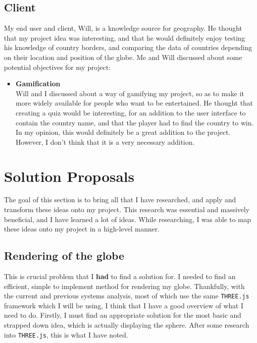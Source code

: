 \subsection{Client}
My end user and client, Will, is a knowledge source for geography. He thought that my project idea was interesting, and that he would definitely enjoy testing his knowledge of country borders, and comparing the data of countries depending on their location and position of the globe. Me and Will discussed about some potential objectives for my project:
\begin{itemize}
    \item \textbf{Gamification} \\
        Will and I discussed about a way of gamifying my project, so as to make it more widely available for people who want to be entertained. He thought that creating a quiz would be interesting, for an addition to the user interface to contain the country name, and that the player had to find the country to win. \\
        In my opinion, this would definitely be a great addition to the project. However, I don't think that it is a very necessary addition.
\end{itemize}

\newpage

\section{Solution Proposals}
The goal of this section is to bring all that I have researched, and apply and transform these ideas onto my project. This research was essential and massively beneficial, and I have learned a lot of ideas. While researching, I was able to map these ideas onto my project in a high-level manner.

\subsection{Rendering of the globe}
This is crucial problem that I \textbf{had} to find a solution for. I needed to find an efficient, simple to implement method for rendering my globe. Thankfully, with the current and previous systems analysis, most of which use the same \verb|THREE.js| framework which I will be using, I think that I have a good overview of what I need to do.
Firstly, I must find an appropriate solution for the most basic and strapped down idea, which is actually displaying the sphere. After some research into \verb|THREE.js|, this is what I have noted. \\ \\

